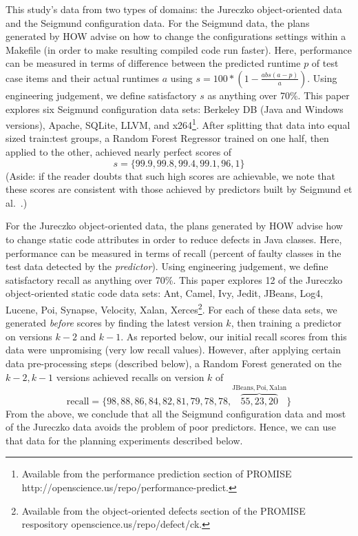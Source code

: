 \documentclass[conference]{IEEEtran}
\begin{document}
This study's data from two types of domains: the Jureczko   object-oriented data  
and the Seigmund configuration data. 
For the Seigmund data, the plans generated by HOW advise on how  to change the   configurations settings within a Makefile
(in order to make resulting compiled
code  run faster). Here, performance can be measured in terms of  difference
between the predicted runtime $p$ of test case items and their actual runtimes $a$
using  $s= 100*(1- \frac{abs(a - p)}{a})$.
Using engineering judgement, we define satisfactory $s$ as anything over   70\%. 
This paper  explores    six Seigmund configuration data sets:  Berkeley DB (Java and Windows versions), Apache, SQLite, LLVM, and
  x264\footnote{Available from the performance prediction section of PROMISE
  http://openscience.us/repo/performance-predict.}. 
  After splitting that data into equal sized train:test groups, a Random Forest
  Regressor trained on one half, then applied to the other, achieved nearly perfect scores of
\[s=\{99.9, 99.8, 99.4, 99.1, 96,1\}\]
(Aside: if the reader doubts that such high scores are achievable, we note that these scores are 
consistent with those achieved by predictors built by Seigmund et al.~\cite{sven12}.)

For the  Jureczko   object-oriented data,
the plans generated by HOW advise   how to change static code attributes in order to reduce defects in
Java classes.  Here,
performance can be measured in terms of recall (percent of faulty classes in
the test data detected
by the {\em predictor}). Using engineering judgement, we define satisfactory recall as anything over   70\%. 
This paper explores 12 of the Jureczko   object-oriented static code data sets: Ant, Camel, Ivy, Jedit, JBeans, Log4, Lucene, Poi, Synapse, Velocity, Xalan, Xerces\footnote{Available from the object-oriented defects section of the PROMISE respository openscience.us/repo/defect/ck.}.
For each of these data sets, we generated  {\em before} scores  by finding the latest
version $k$, then training  a predictor on versions $k-2$ and $k-1$. As reported below,
our initial recall scores from this data were unpromising (very low recall values). However,
after applying certain data pre-processing steps (described below), a Random Forest generated
on the $k-2,k-1$ versions achieved recalls on version $k$ of
\[\mathrm{recall}=\{98,88,86,84,82,81,79,78,78,\overbrace{55,23,20}^{\mathrm{JBeans,Poi,Xalan}}\}\]
From the above, we conclude that all the Seigmund configuration data and most of the Jureczko data
avoids the problem of poor predictors. Hence, we can use that data for the planning
experiments described below.
 
\end{document}
